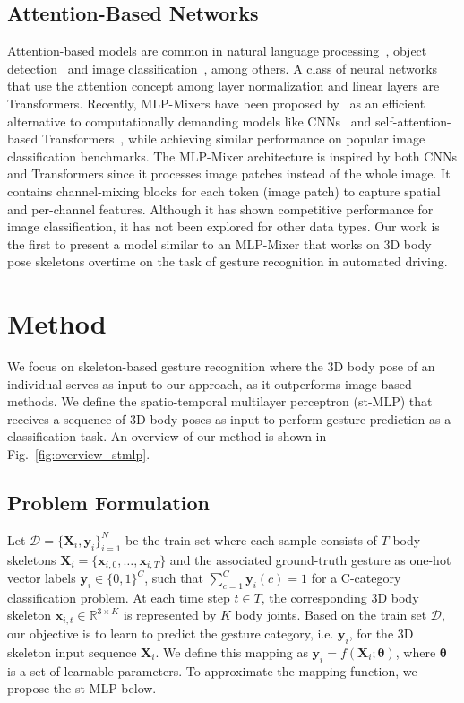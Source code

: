 \documentclass[letterpaper, 10 pt, conference]{ieeeconf}
\begin{document}
\subsection{Attention-Based Networks}
Attention-based models are common in natural language processing~\cite{vaswani2017attention, devlin2018bert, parikh2016decomposable}, object detection~\cite{ramachandran2019stand, carion2020end} and image classification~\cite{dosovitskiy2020image, wu2020visual}, among others. A class of neural networks that use the attention concept among layer normalization and linear layers are Transformers. Recently, MLP-Mixers have been proposed by~\cite{tolstikhin2021mlp} as an efficient alternative to computationally demanding models like CNNs~\cite{krizhevsky2012imagenet} and self-attention-based Transformers~\cite{vaswani2017attention}, while achieving similar performance on popular image classification benchmarks. The MLP-Mixer architecture is inspired by both CNNs and Transformers since it processes image patches instead of the whole image. It contains channel-mixing blocks for each token (image patch) to capture spatial and per-channel features. Although it has shown competitive performance for image classification, it has not been explored for other data types. Our work is the first to present a model similar to an MLP-Mixer that works on 3D body pose skeletons overtime on the task of gesture recognition in automated driving.


\section{Method}
\label{sec:method}
We focus on skeleton-based gesture recognition where the 3D body pose of an individual serves as input to our approach, as it outperforms image-based methods. We define the spatio-temporal multilayer perceptron (st-MLP) that receives a sequence of 3D body poses as input to perform gesture prediction as a classification task. An overview of our method is shown in Fig.~\ref{fig:overview_stmlp}.

\subsection{Problem Formulation}
\label{subsec:problem_formulation}
Let $\mathcal{D} = \{\mathbf{X}_{i},\mathbf{y}_{i} \}_{i=1}^{N}$ be the train set where each sample consists of $T$ body skeletons $\mathbf{X}_{i}=\{\mathbf{x}_{i,0},\dots,\mathbf{x}_{i,T}\}$ and the associated ground-truth gesture as one-hot vector labels $\mathbf{y}_i \in \{0,1\}^{C}$, such that $\sum_{c=1}^{C}\mathbf{y}_i(c)=1$ for a C-category classification problem. At each time step $t\in T$, the corresponding 3D body skeleton $\mathbf{x}_{i,t} \in \mathbb{R}^{3\times K}$ is represented by $K$ body joints. Based on the train set $\mathcal{D}$, our objective is to learn to predict the gesture category, i.e. $\mathbf{y}_{i}$, for the 3D skeleton input sequence $\mathbf{X}_{i}$. We define this mapping as $\mathbf{y}_{i} = f(\mathbf{X}_{i};\mathbf{\theta})$, where $\mathbf{\theta}$ is a set of learnable parameters. To approximate the mapping function, we propose the st-MLP below.
\end{document}

